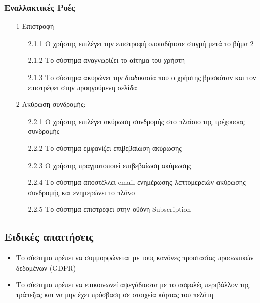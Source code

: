 \documentclass[12pt,a4paper,twoside]{book}
\begin{document}
\subsubsection{Εναλλακτικές Ροές}
\begin{enumerate}
  \item[1 ] Επιστροφή
        \begin{enumerate}
          \item[2.1.1 ] Ο χρήστης επιλέγει την επιστροφή οποιαδήποτε στιγμή μετά το βήμα 2 %
          \item[2.1.2 ] Το σύστημα αναγνωρίζει το αίτημα του χρήστη %
          \item[2.1.3 ] Το σύστημα ακυρώνει την διαδικασία που ο χρήστης βρισκόταν και τον επιστρέφει στην προηγούμενη σελίδα %
        \end{enumerate}
  \item[2 ] Ακύρωση συνδρομής:   %
        \begin{enumerate}
          \item[2.2.1 ] Ο χρήστης επιλέγει ακύρωση συνδρομής στο πλαίσιο της τρέχουσας συνδρομής  %
          \item[2.2.2 ] Το σύστημα εμφανίζει επιβεβαίωση ακύρωσης  %
          \item[2.2.3 ] Ο χρήστης πραγματοποιεί επιβεβαίωση ακύρωσης  %
          \item[2.2.4 ] Το σύστημα αποστέλλει email ενημέρωσης λεπτομερειών ακύρωσης συνδρομής και ενημερώνει το πλάνο %
          \item[2.2.5 ] Το σύστημα επιστρέφει στην οθόνη Subscription  %
        \end{enumerate}
\end{enumerate}

\subsection{Ειδικές απαιτήσεις} %
\begin{itemize}
  \item Το σύστημα πρέπει να συμμορφώνεται με τους κανόνες προστασίας προσωπικών δεδομένων (GDPR)  %
  \item Το σύστημα πρέπει να επικοινωνεί αψεγάδιαστα με το ασφαλές περιβάλλον της τράπεζας και να μην έχει πρόσβαση σε στοιχεία κάρτας του πελάτη   %
\end{itemize}
\end{document}

